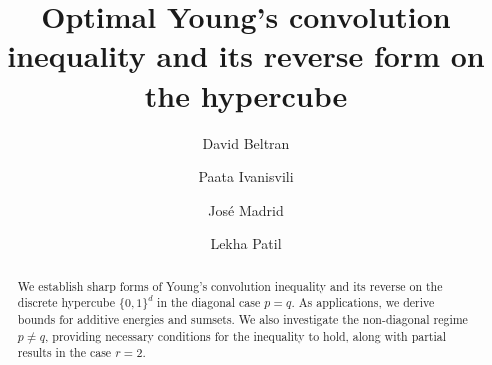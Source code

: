 \documentclass[reqno, 10pt]{amsart}
\theoremstyle{plain}
\numberwithin{equation}{section}
\theoremstyle{definition}
\newtheorem*{induction hypothesis}{Induction hypothesis}
\theoremstyle{remark}
\begin{document}
\title[Young's convolution inequality on the hypercube]{
Optimal Young's convolution inequality and its reverse form on the hypercube}




\author{David Beltran}
\address{(D.B.) Departament d’An\`alisi Matem\`atica, Universitat de Val\`encia, Dr. Moliner 50, 46100 Burjassot, Spain}

\author{Paata Ivanisvili}
\address{(P.I.) Department of Mathematics, University of California, 
Irvine, CA 92617, USA}

\author{Jos\'e Madrid}
\address[(J.M.)]{Department of  Mathematics, Virginia Polytechnic Institute and State University,  225 Stanger Street, Blacksburg, VA 24061-1026, USA
}



\author[Lekha Patil]{Lekha Patil}
\address{(L.P.) Department of Mathematics, University of California, 
Irvine, CA 92617, USA}








\begin{abstract}
We establish sharp forms of Young's convolution inequality and its reverse on the discrete hypercube $\{0,1\}^d$ in the diagonal case $p = q$. As applications, we derive bounds for additive energies and sumsets. We also investigate the non-diagonal regime $p \neq q$, providing necessary conditions for the inequality to hold, along with partial results in the case $r = 2$.

\end{abstract}
\end{document}
